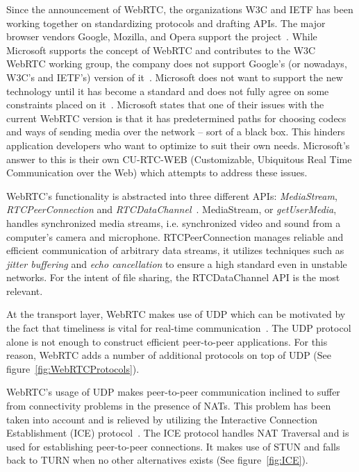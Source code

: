 Since the announcement of WebRTC, the organizations W3C and IETF has been working together on standardizing protocols and drafting APIs. The major browser vendors Google, Mozilla, and Opera support the project~\cite{WebRTCAndMicrosoft:2012:Online}. While Microsoft supports the concept of WebRTC and contributes to the W3C WebRTC working group, the company does not support Google's (or nowadays, W3C's and IETF's) version of it~\cite{WebRTCAndMicrosoft:2012:Online}. Microsoft does not want to support the new technology until it has become a standard and does not fully agree on some constraints placed on it~\cite{WebRTCAndMicrosoft:2012:Online}. Microsoft states that one of their issues with the current WebRTC version is that it has predetermined paths for choosing codecs and ways of sending media over the network – sort of a black box. This hinders application developers who want to optimize to suit their own needs. Microsoft's answer to this is their own CU-RTC-WEB (Customizable, Ubiquitous Real Time Communication over the Web) which attempts to address these issues.

WebRTC's functionality is abstracted into three different APIs: \emph{MediaStream}, \emph{RTCPeerConnection} and \emph{RTCDataChannel}~\cite{WebRTCBasics:2012:Online}. MediaStream, or \emph{getUserMedia}, handles synchronized media streams, i.e. synchronized video and sound from a computer's camera and microphone. RTCPeerConnection manages reliable and efficient communication of arbitrary data streams, it utilizes techniques such as \emph{jitter buffering} and \emph{echo cancellation} to ensure a high standard even in unstable networks. For the intent of file sharing, the RTCDataChannel API is the most relevant.

At the transport layer, WebRTC makes use of UDP which can be motivated by the fact that timeliness is vital for real-time communication~\cite{HighPerfBrowserNetworking:Online}. The UDP protocol alone is not enough to construct efficient peer-to-peer applications. For this reason, WebRTC adds a number of additional protocols on top of UDP (See figure~\ref{fig:WebRTCProtocols}).

WebRTC's usage of UDP makes peer-to-peer communication inclined to suffer from connectivity problems in the presence of NATs. This problem has been taken into account and is relieved by utilizing the Interactive Connection Establishment (ICE) protocol~\cite{RFC5245:Online}. The ICE protocol handles NAT Traversal and is used for establishing peer-to-peer connections. It makes use of STUN and falls back to TURN when no other alternatives exists (See figure~\ref{fig:ICE}).


